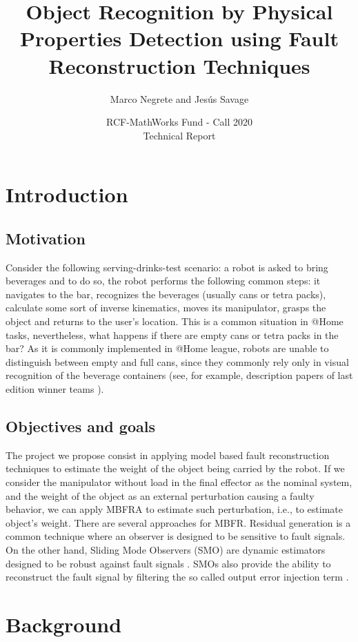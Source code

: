 \documentclass[a4paper, 10pt]{article}
\title{Object Recognition by Physical Properties Detection using Fault Reconstruction Techniques}
\author{Marco Negrete and Jesús Savage}
\date{RCF-MathWorks Fund - Call 2020\\Technical Report}
\begin{document}
\maketitle
\tableofcontents

\section{Introduction}
\subsection{Motivation}
Consider the following serving-drinks-test scenario: a robot is asked to bring beverages and to do so, the robot performs the following common steps: it navigates to the bar, recognizes the beverages (usually cans or tetra packs), calculate some sort of inverse kinematics, moves its manipulator, grasps the object and returns to the user's location. This is a common situation in @Home tasks, nevertheless, what happens if there are empty cans or tetra packs in the bar? As it is commonly implemented in @Home league, robots are unable to distinguish between empty and full cans, since they commonly rely only in visual recognition of the beverage containers (see, for example, description papers of last edition winner teams \cite{tdp2019Eindhoven, tdp2019Homer, tdp2019UTS}).
\subsection{Objectives and goals}
The project we propose consist in applying model based fault reconstruction techniques \cite{ding2013model} to estimate the weight of the object being carried by the robot. If we consider the manipulator without load in the final effector as the nominal system, and the weight of the object as an external perturbation causing a faulty behavior, we can apply MBFRA to estimate such perturbation, i.e., to estimate object's weight. There are several approaches for MBFR. Residual generation is a common technique where an observer is designed to be sensitive to fault signals. On the other hand, Sliding Mode Observers (SMO) are dynamic estimators designed to be robust against fault signals \cite{shtessel2014sliding}. SMOs also provide the ability to reconstruct the fault signal by filtering the so called output error injection term \cite{alwi2011fault}.

\section{Background}
\end{document}
